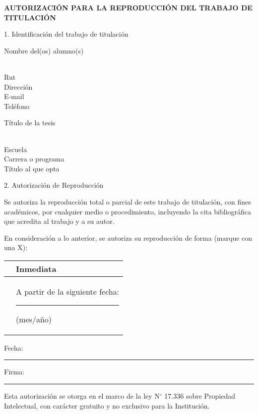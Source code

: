 \begin{singlespace}
    \begin{center}
        \large \textbf{AUTORIZACIÓN PARA LA REPRODUCCIÓN DEL TRABAJO DE TITULACIÓN}
    \end{center}
    \vspace{1cm}
    
    1. Identificación del trabajo de titulación
    
    Nombre del(os) alumno(s)
    
    \dotfill \\
    Rut \dotfill \\
    Dirección \dotfill \\
    E-mail \dotfill \\
    Teléfono \dotfill

    Título de la tesis

    \dotfill \\
    Escuela \dotfill \\
    Carrera o programa \dotfill \\
    Título al que opta \dotfill

    2. Autorización de Reproducción %


    Se autoriza la reproducción total o parcial de este trabajo de titulación, con fines académicos, por cualquier medio o procedimiento, incluyendo la cita bibliográfica que acredita al trabajo y a su autor.
    
    En consideración a lo anterior, se autoriza su reproducción de forma (marque con una X):

    \begin{table}[h]
        \centering
        \renewcommand{\arraystretch}{2}

        \begin{tabularx}{\textwidth}{|p{2cm}|X|}
            \hline
             & Inmediata \\
            \hline
             & A partir de la siguiente fecha: \rule{2cm}{0.4pt} (mes/año) \\
            \hline
        \end{tabularx}
    \end{table}

    \vfill

    Fecha: \rule{4cm}{0.4pt} \hfill Firma: \rule{4cm}{0.4pt} \hspace{2cm}

    \vspace{1cm}

    Esta autorización se otorga en el marco de la ley N$^{\circ}$ 17.336 sobre Propiedad Intelectual, con carácter gratuito y no exclusivo para la Institución.
    
\end{singlespace}
